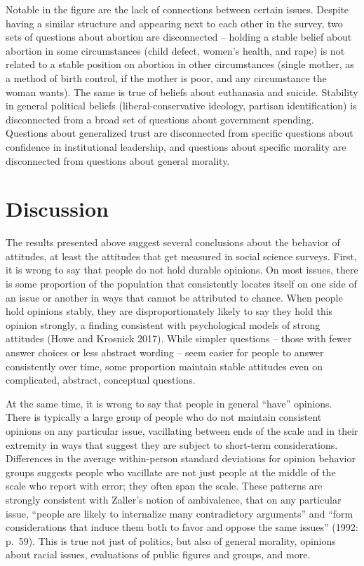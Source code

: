 \documentclass[12pt,]{article}
\begin{document}
Notable in the figure are the lack of connections between certain issues. Despite having a similar structure and appearing next to each other in the survey, two sets of questions about abortion are disconnected -- holding a stable belief about abortion in some circumstances (child defect, women's health, and rape) is not related to a stable position on abortion in other circumstances (single mother, as a method of birth control, if the mother is poor, and any circumstance the woman wants). The same is true of beliefs about euthanasia and suicide. Stability in general political beliefs (liberal-conservative ideology, partisan identification) is disconnected from a broad set of questions about government spending. Questions about generalized trust are disconnected from specific questions about confidence in institutional leadership, and questions about specific morality are disconnected from questions about general morality.

\hypertarget{discussion}{%
\section{Discussion}\label{discussion}}

The results presented above suggest several conclusions about the behavior of attitudes, at least the attitudes that get measured in social science surveys. First, it is wrong to say that people do not hold durable opinions. On most issues, there is some proportion of the population that consistently locates itself on one side of an issue or another in ways that cannot be attributed to chance. When people hold opinions stably, they are disproportionately likely to say they hold this opinion strongly, a finding consistent with psychological models of strong attitudes (Howe and Krosnick 2017). While simpler questions -- those with fewer answer choices or less abstract wording -- seem easier for people to answer consistently over time, some proportion maintain stable attitudes even on complicated, abstract, conceptual questions.

At the same time, it is wrong to say that people in general ``have'' opinions. There is typically a large group of people who do not maintain consistent opinions on any particular issue, vacillating between ends of the scale and in their extremity in ways that suggest they are subject to short-term considerations. Differences in the average within-person standard deviations for opinion behavior groups suggests people who vacillate are not just people at the middle of the scale who report with error; they often span the scale. These patterns are strongly consistent with Zaller's notion of ambivalence, that on any particular issue, ``people are likely to internalize many contradictory arguments'' and ``form considerations that induce them both to favor and oppose the same issues'' (1992: p.~59). This is true not just of politics, but also of general morality, opinions about racial issues, evaluations of public figures and groups, and more.
\end{document}
